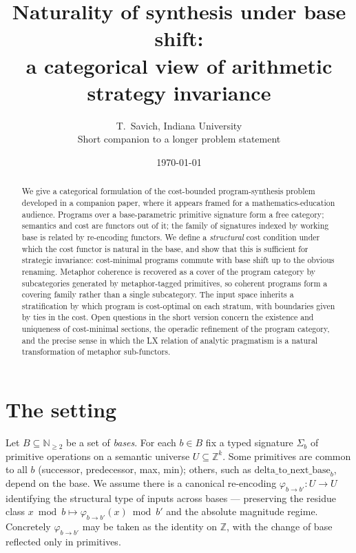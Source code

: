 \documentclass[11pt]{article}
\title{Naturality of synthesis under base shift:\\
       a categorical view of arithmetic strategy invariance}
\author{T.\ Savich, Indiana University\\
\small Short companion to a longer problem statement}
\date{\today}
\begin{document}
\maketitle

\noindent{}
\bigskip

\begin{abstract}
We give a categorical formulation of the cost-bounded program-synthesis
problem developed in a companion paper, where it appears framed for a
mathematics-education audience. Programs over a base-parametric
primitive signature form a free category; semantics and cost are
functors out of it; the family of signatures indexed by working base is
related by re-encoding functors. We define a \emph{structural} cost
condition under which the cost functor is natural in the base, and
show that this is sufficient for strategic invariance: cost-minimal
programs commute with base shift up to the obvious renaming. Metaphor
coherence is recovered as a cover of the program category by
subcategories generated by metaphor-tagged primitives, so coherent
programs form a covering family rather than a single subcategory. The
input space inherits a stratification by which program is cost-optimal
on each stratum, with boundaries given by ties in the cost. Open
questions in the short version concern the existence and uniqueness of
cost-minimal sections, the operadic refinement of the program category,
and the precise sense in which the LX relation of analytic pragmatism
is a natural transformation of metaphor sub-functors.
\end{abstract}

\section{The setting}

Let $B \subseteq \mathbb{N}_{\ge 2}$ be a set of \emph{bases}. For each
$b \in B$ fix a typed signature $\Sigma_b$ of primitive operations on
a semantic universe $U \subseteq \mathbb{Z}^k$. Some primitives are
common to all $b$ (successor, predecessor, max, min); others, such as
$\mathrm{delta\_to\_next\_base}_b$, depend on the base. We assume there
is a canonical re-encoding $\varphi_{b \to b'} : U \to U$ identifying
the structural type of inputs across bases — preserving the residue
class $x \bmod b \mapsto \varphi_{b\to b'}(x) \bmod b'$ and the
absolute magnitude regime. Concretely $\varphi_{b\to b'}$ may be taken
as the identity on $\mathbb{Z}$, with the change of base reflected
only in primitives.
\end{document}
